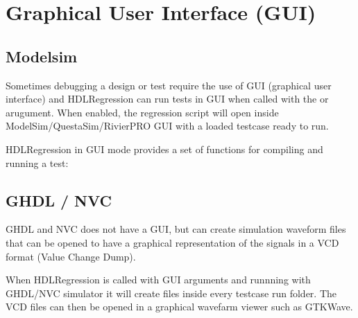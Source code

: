 \documentclass[letterpaper,10pt,english]{sphinxmanual}
\let\sphinxpxdimen\pdfpxdimen\else\newdimen\sphinxpxdimen
\begin{document}
\chapter{Graphical User Interface (GUI)}
\label{\detokenize{gui:graphical-user-interface-gui}}\label{\detokenize{gui::doc}}

\section{Modelsim}
\label{\detokenize{gui:modelsim}}
\sphinxAtStartPar
Sometimes debugging a design or test require the use of GUI (graphical user interface)
and HDLRegression can run tests in GUI when called with the  or  arugument.
When enabled, the regression script will open inside ModelSim/QuestaSim/Rivier\sphinxhyphen{}PRO GUI with a loaded testcase ready to run.

\begin{sphinxVerbatim}[commandchars=\\\{\}]
\end{sphinxVerbatim}

\sphinxAtStartPar
HDLRegression in GUI mode provides a set of functions for compiling and running a
test:

\noindent{\hspace*{\fill}\sphinxincludegraphics[width=550\sphinxpxdimen]{{gui_menu}.png}\hspace*{\fill}}


\section{GHDL / NVC}
\label{\detokenize{gui:ghdl-nvc}}
\sphinxAtStartPar
GHDL and NVC does not have a GUI, but can create simulation waveform files that can be opened to have a graphical representation
of the signals in a VCD format (Value Change Dump).

\sphinxAtStartPar
When HDLRegression is called with GUI arguments and runnning with GHDL/NVC simulator it will create  files
inside every testcase run folder. The VCD files can then be opened in a graphical wavefarm viewer such as GTKWave.

\begin{sphinxVerbatim}[commandchars=\\\{\}]
\end{sphinxVerbatim}
\end{document}
